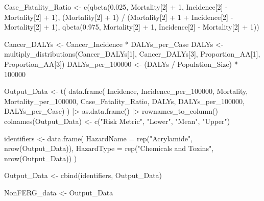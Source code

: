 \documentclass[
  letterpaper,
  DIV=11,
  numbers=noendperiod]{scrartcl}
\newenvironment{Shaded}{\begin{snugshade}}{\end{snugshade}}
\newcommand{\AttributeTok}[1]{\textcolor[rgb]{0.40,0.45,0.13}{#1}}
\newcommand{\DecValTok}[1]{\textcolor[rgb]{0.68,0.00,0.00}{#1}}
\newcommand{\FloatTok}[1]{\textcolor[rgb]{0.68,0.00,0.00}{#1}}
\newcommand{\FunctionTok}[1]{\textcolor[rgb]{0.28,0.35,0.67}{#1}}
\newcommand{\NormalTok}[1]{\textcolor[rgb]{0.00,0.23,0.31}{#1}}
\newcommand{\OtherTok}[1]{\textcolor[rgb]{0.00,0.23,0.31}{#1}}
\newcommand{\SpecialCharTok}[1]{\textcolor[rgb]{0.37,0.37,0.37}{#1}}
\newcommand{\StringTok}[1]{\textcolor[rgb]{0.13,0.47,0.30}{#1}}
\begin{document}
\begin{Shaded}
\begin{Highlighting}[]
\NormalTok{Case\_Fatality\_Ratio }\OtherTok{\textless{}{-}} \FunctionTok{c}\NormalTok{(}\FunctionTok{qbeta}\NormalTok{(}\FloatTok{0.025}\NormalTok{,  Mortality[}\DecValTok{2}\NormalTok{] }\SpecialCharTok{+} \DecValTok{1}\NormalTok{,  Incidence[}\DecValTok{2}\NormalTok{] }\SpecialCharTok{{-}}\NormalTok{ Mortality[}\DecValTok{2}\NormalTok{] }\SpecialCharTok{+} \DecValTok{1}\NormalTok{), }
\NormalTok{       (Mortality[}\DecValTok{2}\NormalTok{] }\SpecialCharTok{+} \DecValTok{1}\NormalTok{)  }\SpecialCharTok{/}\NormalTok{  (Mortality[}\DecValTok{2}\NormalTok{] }\SpecialCharTok{+} \DecValTok{1} \SpecialCharTok{+}\NormalTok{ Incidence[}\DecValTok{2}\NormalTok{] }\SpecialCharTok{{-}}\NormalTok{ Mortality[}\DecValTok{2}\NormalTok{] }\SpecialCharTok{+} \DecValTok{1}\NormalTok{), }
       \FunctionTok{qbeta}\NormalTok{(}\FloatTok{0.975}\NormalTok{,  Mortality[}\DecValTok{2}\NormalTok{] }\SpecialCharTok{+} \DecValTok{1}\NormalTok{,  Incidence[}\DecValTok{2}\NormalTok{] }\SpecialCharTok{{-}}\NormalTok{ Mortality[}\DecValTok{2}\NormalTok{] }\SpecialCharTok{+} \DecValTok{1}\NormalTok{))}

\NormalTok{Cancer\_DALYs }\OtherTok{\textless{}{-}}\NormalTok{ Cancer\_Incidence }\SpecialCharTok{*}\NormalTok{ DALYs\_per\_Case}
\NormalTok{DALYs }\OtherTok{\textless{}{-}} \FunctionTok{multiply\_distributions}\NormalTok{(Cancer\_DALYs[}\DecValTok{1}\NormalTok{], Cancer\_DALYs[}\DecValTok{3}\NormalTok{], Proportion\_AA[}\DecValTok{1}\NormalTok{], Proportion\_AA[}\DecValTok{3}\NormalTok{])}
\NormalTok{DALYs\_per\_100000 }\OtherTok{\textless{}{-}}\NormalTok{ (DALYs }\SpecialCharTok{/}\NormalTok{ Population\_Size) }\SpecialCharTok{*} \DecValTok{100000}

\NormalTok{Output\_Data }\OtherTok{\textless{}{-}} \FunctionTok{t}\NormalTok{(}
 \FunctionTok{data.frame}\NormalTok{(}
\NormalTok{ Incidence,  Incidence\_per\_100000, }
\NormalTok{ Mortality,  Mortality\_per\_100000, }
\NormalTok{ Case\_Fatality\_Ratio, }
\NormalTok{ DALYs,  DALYs\_per\_100000,  DALYs\_per\_Case)}
\NormalTok{ ) }\SpecialCharTok{|\textgreater{}} 
 \FunctionTok{as.data.frame}\NormalTok{() }\SpecialCharTok{|\textgreater{}} 
 \FunctionTok{rownames\_to\_column}\NormalTok{()}
\FunctionTok{colnames}\NormalTok{(Output\_Data) }\OtherTok{\textless{}{-}} \FunctionTok{c}\NormalTok{(}\StringTok{"Risk Metric"}\NormalTok{,  }\StringTok{"Lower"}\NormalTok{,  }\StringTok{"Mean"}\NormalTok{,  }\StringTok{"Upper"}\NormalTok{)}

\NormalTok{identifiers }\OtherTok{\textless{}{-}} \FunctionTok{data.frame}\NormalTok{(}
 \AttributeTok{HazardName =} \FunctionTok{rep}\NormalTok{(}\StringTok{"Acrylamide"}\NormalTok{,  }\FunctionTok{nrow}\NormalTok{(Output\_Data)), }
 \AttributeTok{HazardType =} \FunctionTok{rep}\NormalTok{(}\StringTok{"Chemicals and Toxins"}\NormalTok{,  }\FunctionTok{nrow}\NormalTok{(Output\_Data))}
\NormalTok{ )}
         
\NormalTok{Output\_Data }\OtherTok{\textless{}{-}} \FunctionTok{cbind}\NormalTok{(identifiers,  Output\_Data)}

\NormalTok{NonFERG\_data }\OtherTok{\textless{}{-}}\NormalTok{ Output\_Data}
\end{Highlighting}
\end{Shaded}
\end{document}
